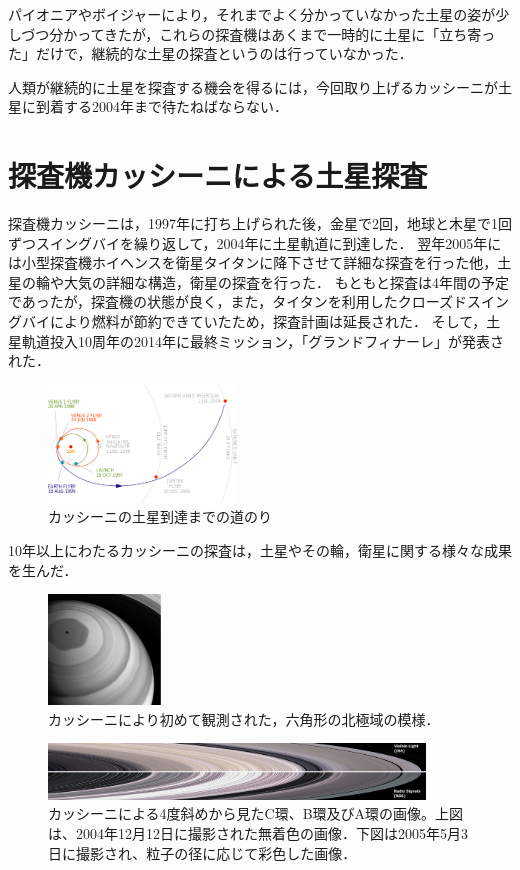 パイオニアやボイジャーにより，それまでよく分かっていなかった土星の姿が少しづつ分かってきたが，これらの探査機はあくまで一時的に土星に「立ち寄った」だけで，継続的な土星の探査というのは行っていなかった．


人類が継続的に土星を探査する機会を得るには，今回取り上げるカッシーニが土星に到着する2004年まで待たねばならない．

\section{探査機カッシーニによる土星探査}


探査機カッシーニは，1997年に打ち上げられた後，金星で2回，地球と木星で1回ずつスイングバイを繰り返して，2004年に土星軌道に到達した．
翌年2005年には小型探査機ホイヘンスを衛星タイタンに降下させて詳細な探査を行った他，土星の輪や大気の詳細な構造，衛星の探査を行った．
もともと探査は4年間の予定であったが，探査機の状態が良く，また，タイタンを利用したクローズドスイングバイにより燃料が節約できていたため，探査計画は延長された．
そして，土星軌道投入10周年の2014年に最終ミッション，「グランドフィナーレ」が発表された．

\begin{figure}[htbp]
\centering
\includegraphics[width=5cm]{img/cassini-orbit.png}
\caption{カッシーニの土星到達までの道のり}
\end{figure}


10年以上にわたるカッシーニの探査は，土星やその輪，衛星に関する様々な成果を生んだ．

\begin{figure}
\centering
\includegraphics[width=3cm]{saturn-cassini_1.png}
\caption{カッシーニにより初めて観測された，六角形の北極域の模様．}
\end{figure}

\begin{figure}[htbp]
\centering
\includegraphics[width=10cm]{img/saturn-ring-cassini-2005.png}
\caption{カッシーニによる4度斜めから見たC環、B環及びA環の画像。上図は、2004年12月12日に撮影された無着色の画像．下図は2005年5月3日に撮影され、粒子の径に応じて彩色した画像．}
\end{figure}

